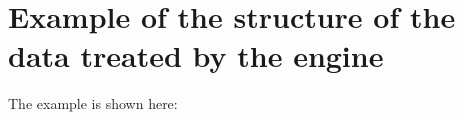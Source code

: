 \chapter{Example of the structure of the data treated by the engine}\label{ap:example_data_structure}

The example is shown here:


